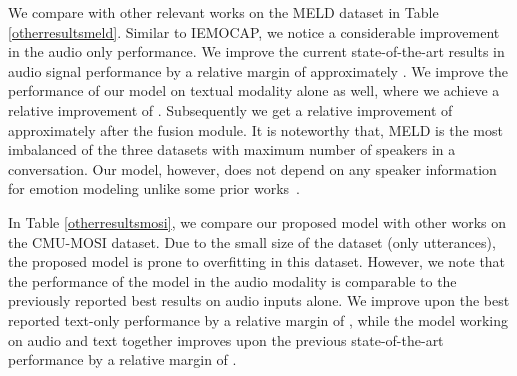 \documentclass[lettersize,journal]{IEEEtran}
\begin{document}
We compare with other relevant works on the MELD dataset in Table \ref{otherresultsmeld}. Similar to IEMOCAP, we notice a considerable improvement in the audio only performance. We improve the current state-of-the-art results in audio signal performance by a relative margin of approximately . We improve the performance of our model on textual modality alone as well, where we achieve a relative improvement of . Subsequently we get a relative improvement of approximately  after the fusion module. It is noteworthy that, MELD is the most imbalanced of the three datasets with maximum number of speakers in a conversation. Our model, however, does not depend on any speaker information for emotion modeling unlike some prior works~\cite{mao2021dialoguetrm}. 



In Table \ref{otherresultsmosi}, we compare our proposed model with other works on the CMU-MOSI dataset. Due to the small size of the dataset (only  utterances), the proposed model is prone to overfitting in this dataset. However, we note that the performance of the model in the audio modality is comparable to the previously reported best results on audio inputs alone. We improve upon the best reported text-only performance by a relative margin of , while the model working on audio and text together improves upon the previous state-of-the-art performance by a relative margin of .
\end{document}
